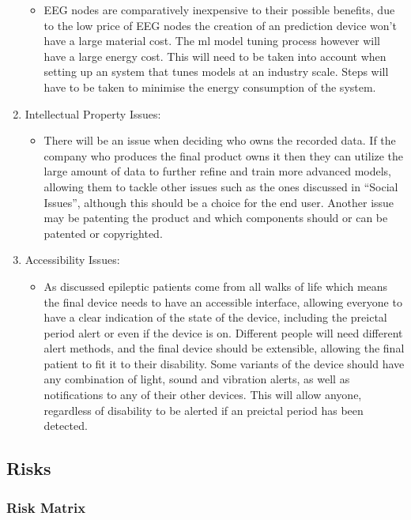 \documentclass[12pt]{article}
\begin{document}
\begin{enumerate}
    \begin{itemize}
    	 \item EEG nodes are comparatively inexpensive to their possible benefits, due to the low price of EEG nodes the creation of an prediction device won't have a large material cost. The \acrshort{ml} model tuning process however will have a large energy cost. This will need to be taken into account when setting up an system that tunes models at an industry scale. Steps will have to be taken to minimise the energy consumption of the system.  
    \end{itemize}
            \item Intellectual Property Issues:
    \begin{itemize}
    	 \item There will be an issue when deciding who owns the recorded data. If the company who produces the final product owns it then they can utilize the large amount of data to further refine and train more advanced models, allowing them to tackle other issues such as the ones discussed in ``Social Issues'', although this should be a choice for the end user. Another issue may be patenting the product and which components should or can be patented or copyrighted.  
    \end{itemize}
        \item Accessibility Issues:
    \begin{itemize}
    	 \item As discussed epileptic patients come from all walks of life which means the final device needs to have an accessible interface, allowing everyone to have a clear indication of the state of the device, including the preictal period alert or even if the device is on. Different people will need different alert methods, and the final device should be extensible, allowing the final patient to fit it to their disability. Some variants of the device should have any combination of light, sound and vibration alerts, as well as notifications to any of their other devices. This will allow anyone, regardless of disability to be alerted if an preictal period has been detected. 
    \end{itemize}
\end{enumerate}

\subsection{Risks}

\subsubsection{Risk Matrix}
\end{document}
